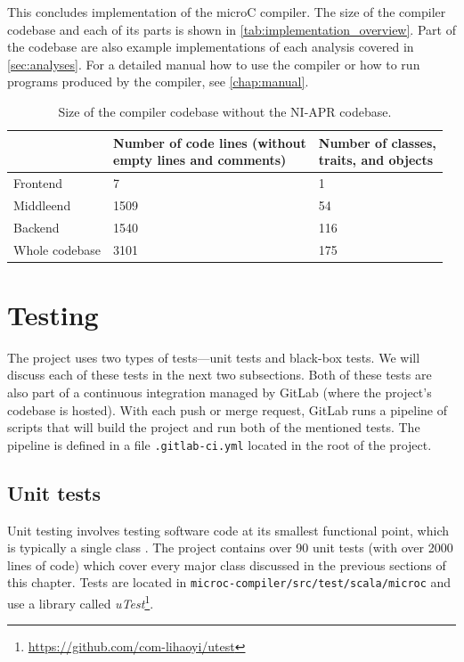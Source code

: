 \documentclass[thesis=M,english]{FITthesis}[2019/12/23]
\begin{document}
This concludes implementation of the microC compiler. The size of the compiler codebase and each of its parts is shown in \autoref{tab:implementation_overview}. Part of the codebase are also example implementations of each analysis covered in \autoref{sec:analyses}. For a detailed manual how to use the compiler or how to run programs produced by the compiler, see \autoref{chap:manual}.

\begin{table}[h]
\centering
\begin{tabular}{|l||l|l|}
\hline
& \makecell{Number of code lines (without \\ empty lines and comments)} & \makecell{Number of classes, \\ traits, and objects}\\
\hline
\hline
Frontend & 7 & 1\\
\hline
Middleend & 1509 & 54\\
\hline
Backend & 1540 & 116\\
\hline
Whole codebase & 3101 & 175\\
\hline
\end{tabular}
\caption{Size of the compiler codebase without the NI-APR codebase.}
\label{tab:implementation_overview}
\end{table}


\section{Testing}
The project uses two types of tests---unit tests and black-box tests. We will discuss each of these tests in the next two subsections. Both of these tests are also part of a continuous integration managed by GitLab (where the project's codebase is hosted). With each push or merge request, GitLab runs a pipeline of scripts that will build the project and run both of the mentioned tests. The pipeline is defined in a file \texttt{.gitlab-ci.yml} located in the root of the project.

\subsection{Unit tests}
Unit testing involves testing software code at its smallest functional point, which is typically a single class \cite[Chap. 3.4.5]{testing}. The project contains over 90 unit tests (with over 2000 lines of code) which cover every major class discussed in the previous sections of this chapter. Tests are located in \texttt{microc-compiler/src/test/scala/microc} and use a library called \emph{uTest}\footnote{\url{https://github.com/com-lihaoyi/utest}}.
\end{document}
